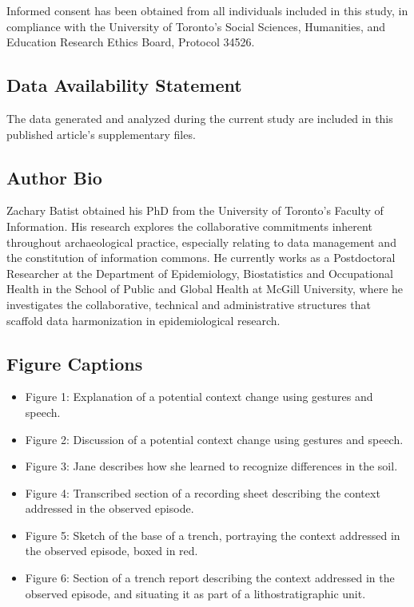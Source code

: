 \documentclass[
]{article}
\providecommand{\tightlist}{%
  \setlength{\itemsep}{0pt}\setlength{\parskip}{0pt}}
\begin{document}
Informed consent has been obtained from all individuals included in this
study, in compliance with the University of Toronto's Social Sciences,
Humanities, and Education Research Ethics Board, Protocol 34526.

\subsection{Data Availability
Statement}\label{data-availability-statement}

The data generated and analyzed during the current study are included in
this published article's supplementary files.

\subsection{Author Bio}\label{author-bio}

Zachary Batist obtained his PhD from the University of Toronto's Faculty
of Information. His research explores the collaborative commitments
inherent throughout archaeological practice, especially relating to data
management and the constitution of information commons. He currently
works as a Postdoctoral Researcher at the Department of Epidemiology,
Biostatistics and Occupational Health in the School of Public and Global
Health at McGill University, where he investigates the collaborative,
technical and administrative structures that scaffold data harmonization
in epidemiological research.

\subsection{Figure Captions}\label{figure-captions}

\begin{itemize}
\tightlist
\item
  Figure 1: Explanation of a potential context change using gestures and
  speech.
\item
  Figure 2: Discussion of a potential context change using gestures and
  speech.
\item
  Figure 3: Jane describes how she learned to recognize differences in
  the soil.
\item
  Figure 4: Transcribed section of a recording sheet describing the
  context addressed in the observed episode.
\item
  Figure 5: Sketch of the base of a trench, portraying the context
  addressed in the observed episode, boxed in red.
\item
  Figure 6: Section of a trench report describing the context addressed
  in the observed episode, and situating it as part of a
  lithostratigraphic unit.
\end{itemize}

\printbibliography
\end{document}
